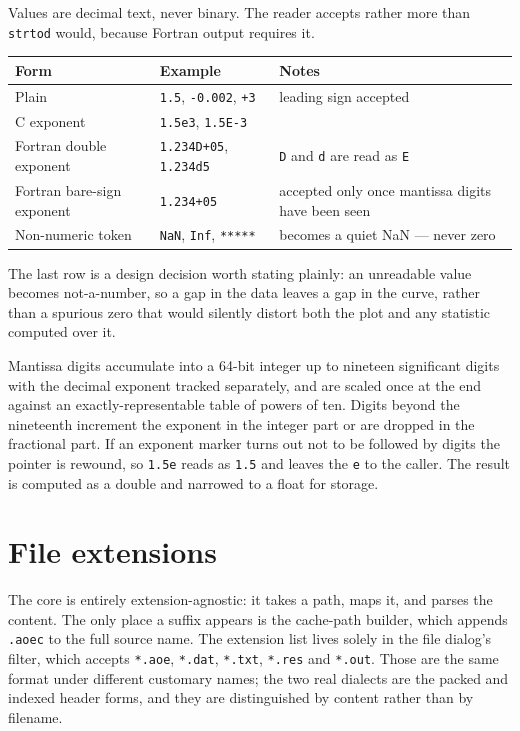\documentclass[11pt,a4paper,oneside]{report}
\newcommand{\code}[1]{\texttt{#1}}
\begin{document}
Values are decimal text, never binary. The reader accepts rather more than
\code{strtod} would, because Fortran output requires it.

\begin{center}
\small
\begin{tabular}{@{}p{}p{}p{}@{}}
\toprule
\textbf{Form} & \textbf{Example} & \textbf{Notes} \\
\midrule
Plain & \code{1.5}, \code{-0.002}, \code{+3} & leading sign accepted \\
C exponent & \code{1.5e3}, \code{1.5E-3} & \\
Fortran double exponent & \code{1.234D+05}, \code{1.234d5} & \code{D} and \code{d} are read as \code{E} \\
Fortran bare-sign exponent & \code{1.234+05} & accepted only once mantissa digits have been seen \\
Non-numeric token & \code{NaN}, \code{Inf}, \code{*****} & becomes a quiet NaN --- never zero \\
\bottomrule
\end{tabular}
\end{center}

The last row is a design decision worth stating plainly: an unreadable value
becomes not-a-number, so a gap in the data leaves a gap in the curve, rather than
a spurious zero that would silently distort both the plot and any statistic
computed over it.

Mantissa digits accumulate into a 64-bit integer up to nineteen significant
digits with the decimal exponent tracked separately, and are scaled once at the
end against an exactly-representable table of powers of ten. Digits beyond the
nineteenth increment the exponent in the integer part or are dropped in the
fractional part. If an exponent marker turns out not to be followed by digits the
pointer is rewound, so \code{1.5e} reads as \code{1.5} and leaves the \code{e} to
the caller. The result is computed as a double and narrowed to a float for
storage.

\section{File extensions}

The core is entirely extension-agnostic: it takes a path, maps it, and parses the
content. The only place a suffix appears is the cache-path builder, which appends
\code{.aoec} to the full source name. The extension list lives solely in the file
dialog's filter, which accepts \code{*.aoe}, \code{*.dat}, \code{*.txt},
\code{*.res} and \code{*.out}. Those are the same format under different
customary names; the two real dialects are the packed and indexed header forms,
and they are distinguished by content rather than by filename.
\end{document}
